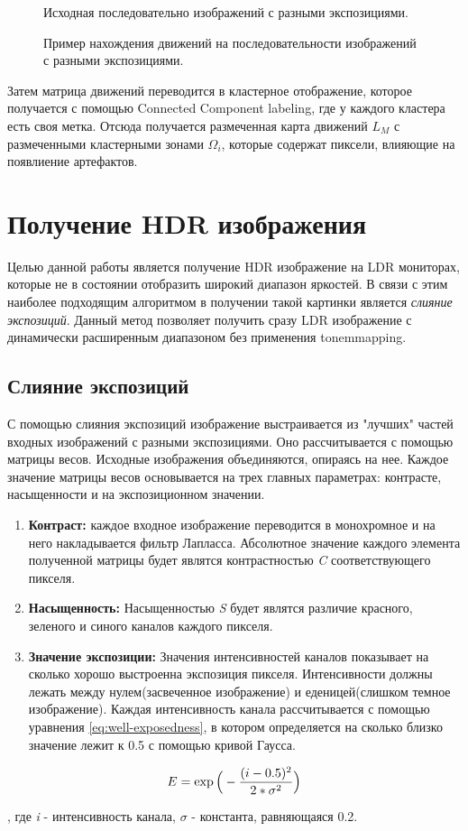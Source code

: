\begin{figure}[!tbp]
\begin{minipage}[b]{.2\textwidth}
    \caption{ Исходная последовательно изображений с разными экспозициями.}
  \end{minipage}
  \caption { Пример нахождения движений на последовательности изображений с разными экспозициями.}
  \label{fig:bmdExample}
\end{figure}

Затем матрица движений переводится в кластерное отображение, которое получается с помощью Connected Component labeling, где у каждого кластера есть своя метка. Отсюда получается размеченная карта движений $L_M$ с размеченными кластерными зонами $\Omega_i$, которые содержат пиксели, влияющие на появлиение артефактов.

\section{ Получение HDR изображения}

Целью данной работы является получение HDR изображение на LDR мониторах, которые не в состоянии отобразить широкий диапазон яркостей. В связи с этим наиболее подходящим алгоритмом в получении такой картинки является \textit{слияние экспозиций}\cite{bib7}. Данный метод позволяет получить сразу LDR изображение с динамически расширенным диапазоном без применения tonemmapping.

\subsection { Слияние экспозиций}

С помощью слияния экспозиций изображение выстраивается из "лучших" частей входных изображений с разными экспозициями. Оно рассчитывается с помощью матрицы весов. Исходные изображения объединяются, опираясь на нее. Каждое значение матрицы весов основывается на трех главных параметрах: контрасте, насыщенности и на экспозиционном значении.

\begin{enumerate}
   \item \textbf{Контраст:} каждое входное изображение переводится в монохромное и на него накладывается фильтр Лапласса. Абсолютное значение каждого элемента полученной матрицы будет являтся контрастностью \textit{C} соответствующего пикселя.
    \item \textbf{Насыщенность:} Насыщенностью \textit{S} будет являтся различие красного, зеленого и синого каналов каждого пикселя.
    \item \textbf{Значение экспозиции:} Значения интенсивностей каналов показывает на сколько хорошо выстроенна экспозиция пикселя. Интенсивности должны лежать между нулем(засвеченное изображение) и еденицей(слишком темное изображение). Каждая интенсивность канала рассчитывается с помощью уравнения \ref{eq:well-exposedness}, в котором определяется на сколько близко значение лежит к 0.5 с помощью кривой Гаусса.
\end{enumerate}

\begin{equation}
    \centering{
        E = \exp{\Big(-\frac{(i-0.5)^2}{2*\sigma^2}\Big)}}
    \label{eq:well-exposedness}
\end{equation}

, где \textit{i} - интенсивность канала, \textit{$\sigma$} - константа, равняющаяся 0.2.
